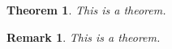 \documentclass{article}
\theoremstyle{break}
\newtheorem{theorem}{Theorem}
\theoremstyle{plain1}
\newtheorem{remark}{Remark}
\begin{document}
\begin{theorem}
  This is a theorem.
\end{theorem}
\begin{remark}
  This is a theorem.
\end{remark}
\end{document}
